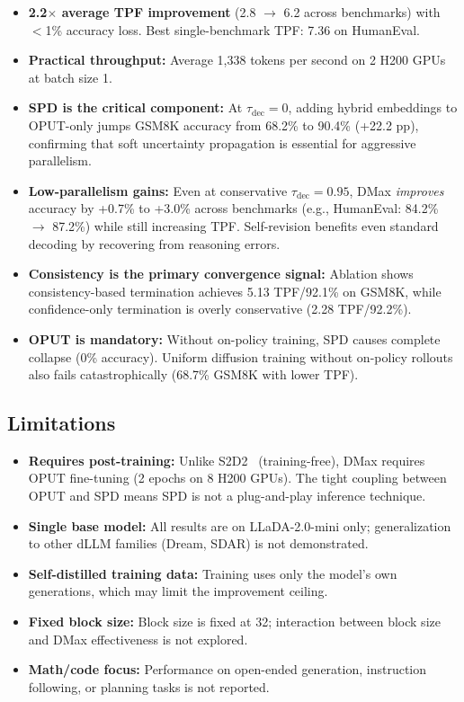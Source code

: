 \documentclass[11pt]{article}
\begin{document}
\begin{itemize}
    \item \textbf{2.2$\times$ average TPF improvement} (2.8 $\to$ 6.2 across benchmarks) with $<$1\% accuracy loss. Best single-benchmark TPF: 7.36 on HumanEval.

    \item \textbf{Practical throughput:} Average 1,338 tokens per second on 2 H200 GPUs at batch size 1.

    \item \textbf{SPD is the critical component:} At $\tau_{\mathrm{dec}} = 0$, adding hybrid embeddings to OPUT-only jumps GSM8K accuracy from 68.2\% to 90.4\% (+22.2 pp), confirming that soft uncertainty propagation is essential for aggressive parallelism.

    \item \textbf{Low-parallelism gains:} Even at conservative $\tau_{\mathrm{dec}} = 0.95$, DMax \textit{improves} accuracy by +0.7\% to +3.0\% across benchmarks (e.g., HumanEval: 84.2\% $\to$ 87.2\%) while still increasing TPF. Self-revision benefits even standard decoding by recovering from reasoning errors.

    \item \textbf{Consistency is the primary convergence signal:} Ablation shows consistency-based termination achieves 5.13 TPF/92.1\% on GSM8K, while confidence-only termination is overly conservative (2.28 TPF/92.2\%).

    \item \textbf{OPUT is mandatory:} Without on-policy training, SPD causes complete collapse (0\% accuracy). Uniform diffusion training without on-policy rollouts also fails catastrophically (68.7\% GSM8K with lower TPF).
\end{itemize}

\subsection{Limitations}

\begin{itemize}
    \item \textbf{Requires post-training:} Unlike S2D2~\cite{s2d2} (training-free), DMax requires OPUT fine-tuning (2 epochs on 8 H200 GPUs). The tight coupling between OPUT and SPD means SPD is not a plug-and-play inference technique.
    \item \textbf{Single base model:} All results are on LLaDA-2.0-mini only; generalization to other dLLM families (Dream, SDAR) is not demonstrated.
    \item \textbf{Self-distilled training data:} Training uses only the model's own generations, which may limit the improvement ceiling.
    \item \textbf{Fixed block size:} Block size is fixed at 32; interaction between block size and DMax effectiveness is not explored.
    \item \textbf{Math/code focus:} Performance on open-ended generation, instruction following, or planning tasks is not reported.
\end{itemize}
\end{document}
